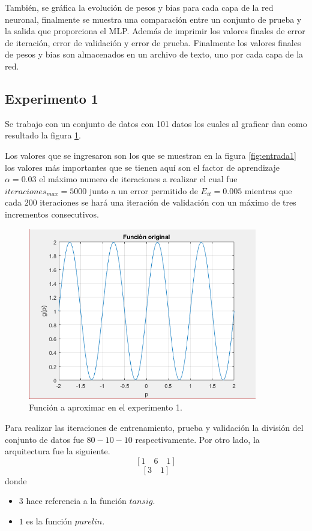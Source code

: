 \documentclass[12pt, titlepage]{article}
\begin{document}
También, se gráfica la evolución de pesos y bias para cada capa de la red neuronal, finalmente se muestra una comparación entre un conjunto de prueba y la salida que proporciona el MLP. Además de imprimir los valores finales de error de iteración, error de validación y error de prueba. Finalmente los valores finales de pesos y bias son almacenados en un archivo de texto, uno por cada capa de la red.
\subsection{Experimento 1}
Se trabajo con un conjunto de datos con 101 datos los cuales al graficar dan como resultado la figura \ref{fig:original1}.

Los valores que se ingresaron son los que se muestran en la figura \ref{fig:entrada1} los valores más importantes que se tienen aquí son el factor de aprendizaje $\alpha=0.03$ el máximo numero de iteraciones a realizar el cual fue $iteraciones_{max} = 5000$ junto a un error permitido de $E_{it} = 0.005$ mientras que cada $200$ iteraciones se hará una iteración de validación con un máximo de tres incrementos consecutivos.
\begin{figure}[H]
    \begin{center}
        \includegraphics[width=10cm]{1/original.png}
        \caption{Función a aproximar en el experimento 1.}
        \label{fig:original1}
    \end{center}
\end{figure}
Para realizar las iteraciones de entrenamiento, prueba y validación la división del conjunto de datos fue $80-10-10$ respectivamente. Por otro lado, la arquitectura fue la siguiente.
\[ \left[ 1 \quad 6 \quad 1 \right] \]
\[ \left[ 3 \quad 1 \right] \]
donde
\begin{itemize}
    \item $3$ hace referencia a la función $tansig$.
    \item $1$ es la función $purelin$.
\end{itemize}
\end{document}
